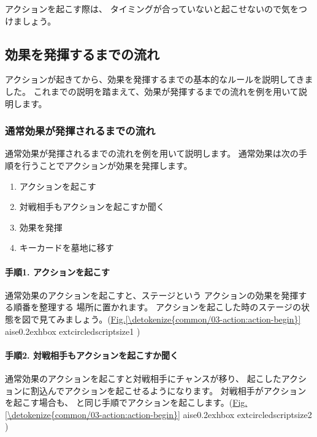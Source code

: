 \documentclass[letterpaper,10pt,dvipdfmx]{sphinxmanual}
\begin{document}
アクションを起こす際は、
タイミングが合っていないと起こせないので気をつけましょう。


\subsection{効果を発揮するまでの流れ}
\label{\detokenize{common/03-action:action-flow}}\label{\detokenize{common/03-action:id25}}
アクションが起きてから、効果を発揮するまでの基本的なルールを説明してきました。
これまでの説明を踏まえて、効果が発揮するまでの流れを例を用いて説明します。


\subsubsection{通常効果が発揮されるまでの流れ}
\label{\detokenize{common/03-action:id26}}
通常効果が発揮されるまでの流れを例を用いて説明します。
通常効果は次の手順を行うことでアクションが効果を発揮します。
\begin{enumerate}
%
\item {} 
アクションを起こす

\item {} 
対戦相手もアクションを起こすか聞く

\item {} 
効果を発揮

\item {} 
キーカードを墓地に移す

\end{enumerate}


\paragraph{手順1. アクションを起こす}
\label{\detokenize{common/03-action:id27}}
通常効果のアクションを起こすと、ステージという
アクションの効果を発揮する順番を整理する
場所に置かれます。
アクションを起こした時のステージの状態を図で見てみましょう。(\hyperref[\detokenize{common/03-action:action-begin}]{Fig.\@ \ref{\detokenize{common/03-action:action-begin}}} 
aise0.2exhbox{	extcircled{scriptsize{1}}} )


\paragraph{手順2. 対戦相手もアクションを起こすか聞く}
\label{\detokenize{common/03-action:id28}}
通常効果のアクションを起こすと対戦相手にチャンスが移り、
起こしたアクションに割込んでアクションを起こせるようになります。
対戦相手がアクションを起こす場合も、 {\hyperref[\detokenize{common/03-action:action-howto}]{}} と同じ手順でアクションを起こします。(\hyperref[\detokenize{common/03-action:action-begin}]{Fig.\@ \ref{\detokenize{common/03-action:action-begin}}} 
aise0.2exhbox{	extcircled{scriptsize{2}}} )
\end{document}
